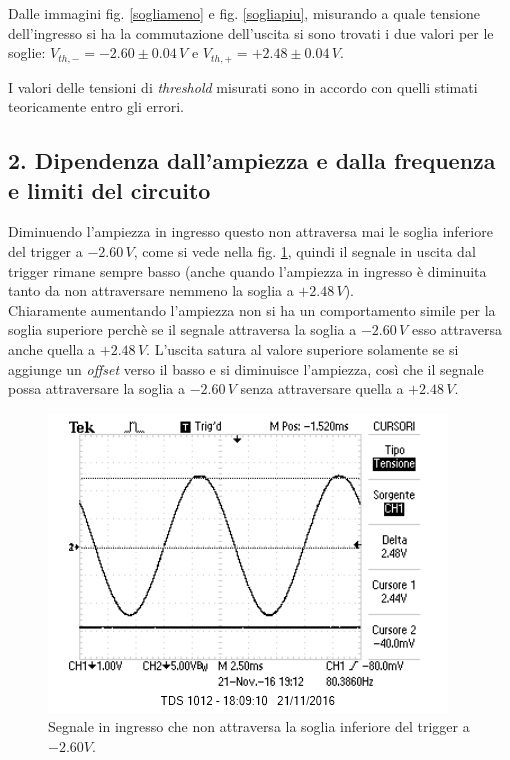 \documentclass[10pt,a4paper]{article}
\begin{document}
Dalle immagini fig. \ref{sogliameno} e fig. \ref{sogliapiu}, misurando a quale tensione dell'ingresso si ha la commutazione dell'uscita si sono trovati i due valori per le soglie: $V_{th, -} =-2.60 \pm 0.04 \, V $ e $V_{th, +} = +2.48 \pm 0.04 \, V$.

I valori delle tensioni di \emph{threshold} misurati sono in accordo con quelli stimati teoricamente entro gli errori.

\subsection*{2. Dipendenza dall'ampiezza e dalla frequenza e limiti del circuito}

Diminuendo l'ampiezza in ingresso questo non attraversa mai le soglia inferiore del trigger a $-2.60\,V$, come si vede nella fig. \ref{sottoSoglia}, quindi il segnale in uscita dal trigger rimane sempre basso (anche quando l'ampiezza in ingresso è diminuita tanto da non attraversare nemmeno la soglia a $+2.48\,V$).\\
Chiaramente aumentando l'ampiezza non si ha un comportamento simile per la soglia superiore perchè se il segnale attraversa la soglia a $-2.60\,V$ esso attraversa anche quella a $+2.48\,V$. L'uscita satura al valore superiore solamente se si aggiunge un \emph{offset} verso il basso e si diminuisce l'ampiezza, così che il segnale possa attraversare la soglia a $-2.60\,V$ senza attraversare quella a $+2.48\,V$.

\begin{figure}[htb!]
\centering
\includegraphics[scale=1.0]{immagini/sottoSogliaInferiore.png}
\caption{Segnale in ingresso che non attraversa la soglia inferiore del trigger a $-2.60V$.}
\label{sottoSoglia}
\end{figure}
\end{document}
